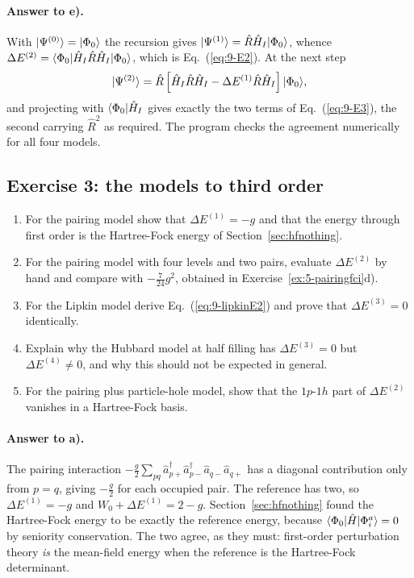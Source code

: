 \paragraph{Answer to e).}
With $\vert \Psi^{(0)} \rangle=\vert \Phi_0 \rangle$ the recursion gives
$\vert \Psi^{(1)} \rangle=\hat{R}\hat{H}_I\vert \Phi_0 \rangle$, whence
$\Delta E^{(2)}=\langle \Phi_0 | \hat{H}_I\hat{R}\hat{H}_I | \Phi_0 \rangle$, which
is Eq.~(\ref{eq:9-E2}).  At the next step
\begin{equation}
  \vert \Psi^{(2)} \rangle = \hat{R}\left[\hat{H}_I\hat{R}\hat{H}_I
    - \Delta E^{(1)}\hat{R}\hat{H}_I\right]\vert \Phi_0 \rangle,
  \label{eq:9-exe2}
\end{equation}
and projecting with $\langle \Phi_0 \vert\hat{H}_I$ gives exactly the two terms of
Eq.~(\ref{eq:9-E3}), the second carrying $\hat{R}^2$ as required.  The
program checks the agreement numerically for all four models.

\subsection*{Exercise 3: the models to third order}
\label{ex:9-models}

\begin{enumerate}
  \item[a)] For the pairing model show that
  $\Delta E^{(1)}=-g$ and that the energy through first order is the
  Hartree-Fock energy of Section~\ref{sec:hfnothing}.
  \item[b)] For the pairing model with four levels and two pairs, evaluate
  $\Delta E^{(2)}$ by hand and compare with $-\tfrac{7}{24}g^2$, obtained in
  Exercise~\ref{ex:5-pairingfci}d).
  \item[c)] For the Lipkin model derive Eq.~(\ref{eq:9-lipkinE2}) and prove
  that $\Delta E^{(3)}=0$ identically.
  \item[d)] Explain why the Hubbard model at half filling has
  $\Delta E^{(3)}=0$ but $\Delta E^{(4)}\ne0$, and why this should not be
  expected in general.
  \item[e)] For the pairing plus particle-hole model, show that the
  $1p$-$1h$ part of $\Delta E^{(2)}$ vanishes in a Hartree-Fock basis.
\end{enumerate}

\paragraph{Answer to a).}
The pairing interaction
$-\tfrac{g}{2}\sum_{pq}\hat{a}^{\dagger}_{p+}\hat{a}^{\dagger}_{p-}
\hat{a}_{q-}\hat{a}_{q+}$ has a diagonal contribution only from $p=q$, giving
$-\tfrac{g}{2}$ for each occupied pair.  The reference has two, so
$\Delta E^{(1)}=-g$ and $W_0+\Delta E^{(1)}=2-g$.
Section~\ref{sec:hfnothing} found the Hartree-Fock energy to be exactly the
reference energy, because $\langle \Phi_0 | \hat{H} | \Phi_i^a \rangle=0$ by
seniority conservation.  The two agree, as they must: first-order
perturbation theory \emph{is} the mean-field energy when the reference is the
Hartree-Fock determinant.

